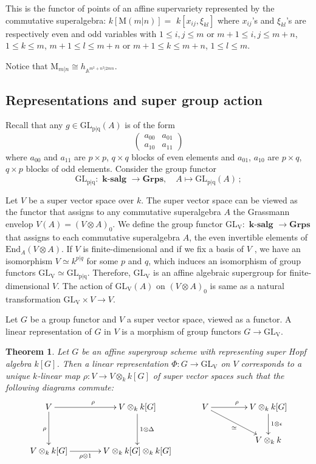 \documentclass[12pt, reqno]{amsart}
\theoremstyle{plain}
\newtheorem{theorem}{Theorem}[section]
\numberwithin{equation}{section}
\def \ra{\rightarrow}
\newcommand{\salg} {\textbf{ k-salg }}
\newcommand{\grps} {\textbf{Grps}}
\newcommand{\bA} {\mathbb{A}}
\newcommand{\rM}{\mathrm{M}}
\newcommand{\GL}[1][]{\mathrm{GL_{p|q}}{#1}}
\newcommand{\GLV}[1][]{\mathrm{GL_{V}}{#1}}
\begin{document}
This is the functor of points
of an affine supervariety represented by the commutative
superalgebra: $k[\rM(m|n)]=$ $k[x_{ij},\xi_{kl}]$
where $x_{ij}$'s
and $\xi_{kl}$'s are respectively even and odd variables
with
$1 \leq i,j \leq m$ or  $m+1 \leq i,j \leq m+n$,
$1 \leq k \leq m$, $m+1 \leq l \leq m+n$ or
$m+1 \leq k \leq m+n$, $1 \leq l \leq m$.

Notice that $\rM_{m|n} \cong h_{\bA^{m^2+n^2|2mn}}$.


\subsection{Representations and super group action}
Recall that any $g\in \GL[(A)]$ is of the form
\[
\begin{pmatrix}
a_{00} & a_{01} \\ a_{10} & a_{11} 
\end{pmatrix}
\]
where $a_{00}$ and $a_{11}$ are $p \times p$, $q \times q$ 
blocks of even elements and $a_{01}$, $a_{10}$ are $p\times q$,
$q \times p$ blocks of odd elements.
Consider the group functor 
$$
\GL: \salg \ra \grps, \quad A\mapsto \GL[(A)] \,;
$$

Let $V$ be a super vector space over $k$. The super vector space can be viewed as the functor that assigns to any commutative superalgebra $A$ the Grassmann envelop $V(A) = (V\otimes A)_0$. 
We define the group functor $\GLV : \salg \ra \grps$ that assigns to each commutative superalgebra $A$, the even invertible elements of $\mathrm{End}_A(V \otimes A)$. If $V$ is finite-dimensional 
and if we fix a basis of $V$ , we have an isomorphism 
$V \simeq k^{p|q}$ for some $p$ and $q$, which induces an isomorphism of group functors $\GLV \simeq \GL$. Therefore, 
$\GLV$ is an affine algebraic supergroup for finite-dimensional 
$V$. The action of $\GLV[(A)]$ on $(V \otimes A)_0$ is same as 
a natural transformation $\GLV \times V \ra V $.

Let $G$ be a group functor and $V$ a super vector space, viewed as a functor. A linear representation of $G$ in $V$ is a morphism of group functors $G \ra \GLV $.

\begin{theorem}\cite{We09}
Let $G$ be an affine supergroup scheme with representing super Hopf algebra $k[G]$. Then a linear representation 
$\Phi\colon G \ra \GLV$ on $V$ corresponds to a unique $k$-linear map 
$\rho\colon V \ra V \otimes_k k[G]$ of super vector spaces such that the following diagrams commute:
\[
\xymatrix@C=3.0pc @R=3.0pc{
V \ar[r]^\rho \ar[d]_\rho & V\otimes_k k[G] \ar[d]^{1\otimes \Delta} \\
V\otimes_k k[G] \ar[r]_-{\rho\otimes 1} & V\otimes_k k[G]\otimes_k k[G]
}
~~~~~~~~~
\xymatrix@C=3.5pc{
V \ar[r]^\rho \ar[rd]_\simeq &
V\otimes_k k[G] \ar[d]^{1\otimes \epsilon} \\
& V\otimes_k k
}
\]
\end{theorem}
\end{document}
